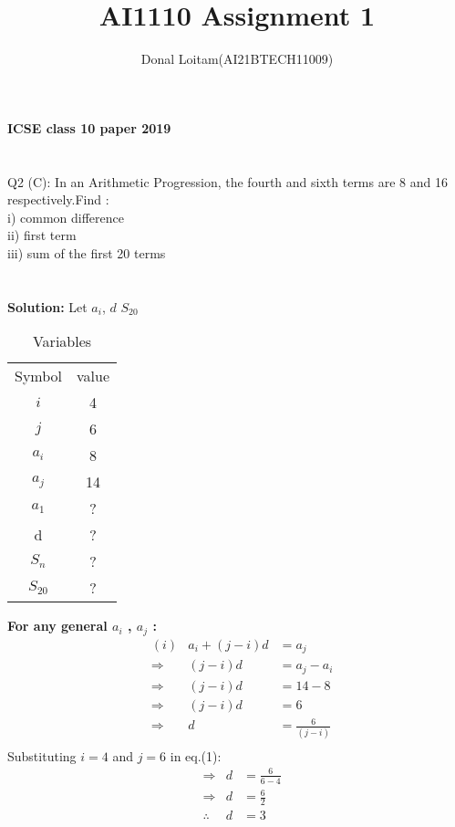 \documentclass[journal, 12pt, twocolumn]{IEEEtran}
\title{AI1110 Assignment 1}
\author{Donal Loitam(AI21BTECH11009)}
\begin{document}
    \maketitle

    \textbf{\large{ICSE class 10 paper 2019}}\\
    \\
    \\
    {Q2 (C):
    In an Arithmetic Progression, the fourth and sixth terms are 8 and 16 respectively.Find :\\
 i) common difference\\
 ii) first term\\
 iii) sum of the first 20 terms}\\\\\\
    \textbf{\large{Solution:}}
    Let $a_i$, 
 \(d\) 
$S_{20}$\\

\begin{table}[h!]
\caption{Variables}
    \centering
    \begin{tabular}{|c|c|}
        \hline
        Symbol & value \\
        $ i $  &  4   \\
         $ j $  &  6   \\
         $ a_i $ &  8  \\
         $ a_j $ & 14  \\
         $ a_1 $ &  ?  \\
            d    &  ?  \\
        $S_{n}$  &  ?  \\
       $S_{20}$  &  ?  \\
          \hline
    \end{tabular}
\end{table}
    


\textbf{For any general $a_i$ , $a_j$ :}\\
\begin{align*}
        &(i)&a_i + (j-i)d &= a_j\\
        &\Rightarrow & (j-i)d &= a_j - a_i\\
        &\Rightarrow & (j-i)d &= 14 - 8\\
        &\Rightarrow & (j-i)d &= 6\\
        &\Rightarrow & d  &= \tfrac{6}{(j-i)} \tag{1}\\ 
    \end{align*}
Substituting  $i=4$ and $j=6$ in eq.(1):
\begin{align*}
    & \Rightarrow & d  &= \tfrac{6}{6-4} \\
    & \Rightarrow & d  &= \tfrac{6}{2} \\
        &  \therefore  & d  &=  3 \tag{2}  \\
\end{align*}
    
\end{document}
